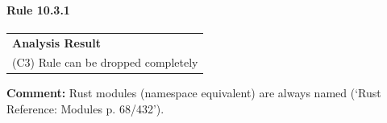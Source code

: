 \paragraph{Rule 10.3.1}
\begin{longtable}{p{13cm}}
\textbf{Analysis Result} \\
(C3) Rule can be dropped completely \\
\end{longtable}
\textbf{Comment:} Rust modules (namespace equivalent) are always named (`Rust Reference: Modules p. 68/432'). \\
